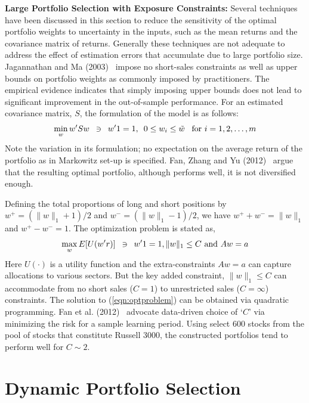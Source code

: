 \noindent\textbf{Large Portfolio Selection with Exposure Constraints:} Several techniques have been discussed in this section to reduce the sensitivity of the optimal portfolio weights to uncertainty in the inputs, such as the mean returns and the covariance matrix of returns. Generally these techniques are not adequate to address the effect of estimation errors that accumulate due to large portfolio size. Jagannathan and Ma (2003)~\cite{jagma} impose no short-sales constraints as well as upper bounds on portfolio weights as commonly imposed by practitioners. The empirical evidence indicates that simply imposing upper bounds does not lead to significant improvement in the out-of-sample performance. For an estimated covariance matrix, $S$, the formulation of the model is as follows:
	\begin{equation}\label{eqn:estcovmat}
	\min_w w'Sw \enskip \ni \enskip w'1=1, \enskip 0\leq w_i \leq \tilde{w} \enskip\text{ for }i=1,2,\ldots,m
	\end{equation}
Note the variation in its formulation; no expectation on the average return of the portfolio as in Markowitz set-up is specified. Fan, Zhang and Yu (2012)~\cite{fanzhanyu} argue that the resulting optimal portfolio, although performs well, it is not diversified enough. 


Defining the total proportions of long and short positions by $w^+=(\|w\|_1+1)/2$ and $w^-=(\|w\|_1-1)/2$, we have $w^+ + w^-= \|w\|_1$ and $w^+ - w^- =1$. The optimization problem is stated as,
	\begin{equation} \label{eqn:optproblem}
	\max_w E[U(w'r)] \enskip \ni \enskip w'1=1, \|w\|_1 \leq C \text{ and } Aw=a
	\end{equation}
Here $U(\cdot)$ is a utility function and the extra-constraints $Aw=a$ can capture allocations to various sectors. But the key added constraint, $\|w\|_1 \leq C$ can accommodate from no short sales ($C=1$) to unrestricted sales ($C=\infty$) constraints. The solution to (\ref{eqn:optproblem}) can be obtained via quadratic programming. Fan et al. (2012)~\cite{fanzhanyu} advocate data-driven choice of `$C$' via minimizing the risk for a sample learning period. Using select 600 stocks from the pool of stocks that constitute Russell 3000, the constructed portfolios tend to perform well for $C \sim 2$. 


\section{Dynamic Portfolio Selection}


